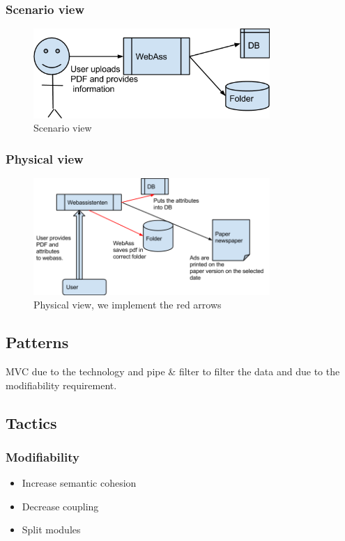 \subsubsection{Scenario view}
\begin{figure}[h]
\centering
\includegraphics[width=0.8\textwidth]{images/architecture01.png}
\caption{Scenario view}
\label{fig:scenario_view}
\end{figure}



\subsubsection{Physical view}
\begin{figure}[h]
\centering
\includegraphics[width=0.8\textwidth]{images/architecture02.png}
\caption{Physical view, we implement the red arrows}
\label{fig:physical_view}
\end{figure}

\subsection{Patterns}
MVC due to the technology and pipe \&  filter to filter the data and due to the modifiability requirement.
\subsection{Tactics}
\subsubsection{Modifiability}
\begin{itemize}
\item Increase semantic cohesion
\item Decrease coupling
\item Split modules
\end{itemize}

